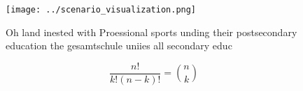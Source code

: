 \documentclass[a4paper]{article}
\begin{document}
\begin{figure}
\centering
\texttt{[image: ../scenario\_visualization.png]}
\caption{Oh land inested with Proessional sports unding their postsecondary education the gesamtschule uniies all secondary educ
}
\end{figure}
 
\[ \frac{n!}{k!(n-k)!} = \binom{n}{k} \]
\end{document}
